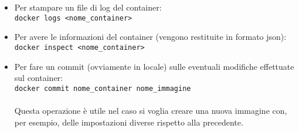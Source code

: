 \begin{itemize}
\item Per stampare un file di log del container:\\
\texttt{docker logs <nome\_container>}\\

\item Per avere le informazioni del container (vengono restituite in formato json):\\
\texttt{docker inspect <nome\_container>}\\

\item Per fare un commit (ovviamente in locale) sulle eventuali modifiche effettuate sul container:\\
\texttt{docker commit nome\_container nome\_immagine}\\\\
Questa operazione è utile nel caso si voglia creare una nuova immagine con, per esempio, delle impostazioni diverse rispetto alla precedente.
\end{itemize}